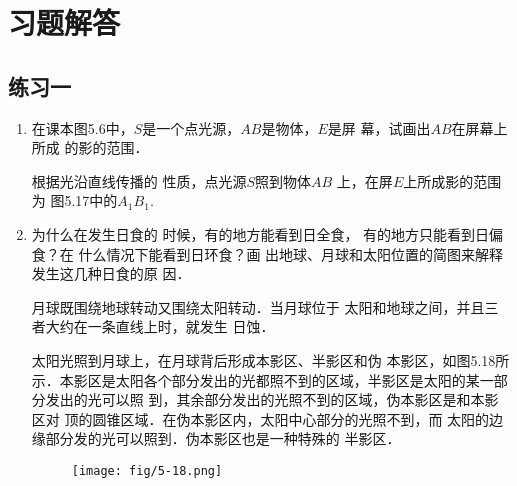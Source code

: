 \section{习题解答}


\subsection{练习一}
\begin{enumerate}
    \item 在课本图5.6中，$S$是一个点光源，$AB$是物体，$E$是屏
幕，试画出$AB$在屏幕上所成
的影的范围．
\begin{figure}[htp]
	\centering
{}
	\caption{}
\end{figure}


\begin{solution}
    根据光沿直线传播的
    性质，点光源$S$照到物体$AB$
    上，在屏$E$上所成影的范围为
    图5.17中的$A_1B_1$.
\end{solution}


\item 为什么在发生日食的
时候，有的地方能看到日全食，
有的地方只能看到日偏食？在
什么情况下能看到日环食？画
出地球、月球和太阳位置的简图来解释发生这几种日食的原
因．

\begin{solution}
    月球既围绕地球转动又围绕太阳转动．当月球位于
    太阳和地球之间，并且三者大约在一条直线上时，就发生
    日蚀．

    
    太阳光照到月球上，在月球背后形成本影区、半影区和伪
    本影区，如图5.18所示．本影区是太阳各个部分发出的光都照不到的区域，半影区是太阳的某一部分发出的光可以照
    到，其余部分发出的光照不到的区域，伪本影区是和本影区对
    顶的圆锥区域．在伪本影区内，太阳中心部分的光照不到，而
    太阳的边缘部分发的光可以照到．伪本影区也是一种特殊的
    半影区．    

    \begin{figure}[htp]
        \centering
        \texttt{[image: fig/5-18.png]}
        \caption{}
    \end{figure}


\end{solution}
\end{enumerate}
